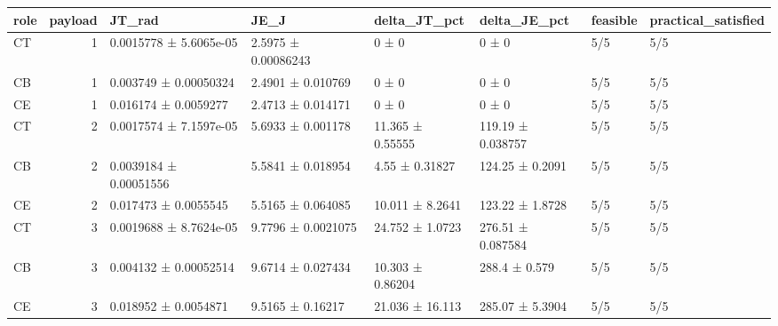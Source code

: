 \begin{tabular}{lrllllll}
\toprule
role & payload & JT\_rad & JE\_J & delta\_JT\_pct & delta\_JE\_pct & feasible & practical\_satisfied \\
\midrule
CT & 1 & 0.0015778 ± 5.6065e-05 & 2.5975 ± 0.00086243 & 0 ± 0 & 0 ± 0 & 5/5 & 5/5 \\
CB & 1 & 0.003749 ± 0.00050324 & 2.4901 ± 0.010769 & 0 ± 0 & 0 ± 0 & 5/5 & 5/5 \\
CE & 1 & 0.016174 ± 0.0059277 & 2.4713 ± 0.014171 & 0 ± 0 & 0 ± 0 & 5/5 & 5/5 \\
CT & 2 & 0.0017574 ± 7.1597e-05 & 5.6933 ± 0.001178 & 11.365 ± 0.55555 & 119.19 ± 0.038757 & 5/5 & 5/5 \\
CB & 2 & 0.0039184 ± 0.00051556 & 5.5841 ± 0.018954 & 4.55 ± 0.31827 & 124.25 ± 0.2091 & 5/5 & 5/5 \\
CE & 2 & 0.017473 ± 0.0055545 & 5.5165 ± 0.064085 & 10.011 ± 8.2641 & 123.22 ± 1.8728 & 5/5 & 5/5 \\
CT & 3 & 0.0019688 ± 8.7624e-05 & 9.7796 ± 0.0021075 & 24.752 ± 1.0723 & 276.51 ± 0.087584 & 5/5 & 5/5 \\
CB & 3 & 0.004132 ± 0.00052514 & 9.6714 ± 0.027434 & 10.303 ± 0.86204 & 288.4 ± 0.579 & 5/5 & 5/5 \\
CE & 3 & 0.018952 ± 0.0054871 & 9.5165 ± 0.16217 & 21.036 ± 16.113 & 285.07 ± 5.3904 & 5/5 & 5/5 \\
\bottomrule
\end{tabular}
